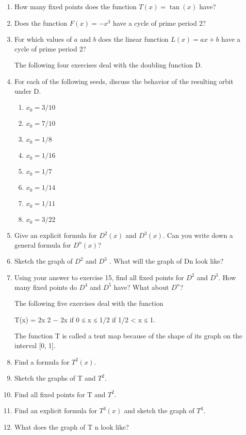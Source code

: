 \documentclass{beamer}
\begin{document}
\begin{frame}
\begin{enumerate}
\item How many ﬁxed points does the function $T(x) = \tan(x)$ have?
\item Does the function $F(x) = -x^3$ have a cycle of prime period 2?
\item For which values of $a$ and $b$ does the linear function $L(x) = ax + b$ have a cycle of prime period 2?

The following four exercises deal with the doubling function D.

\item For each of the following seeds, discuss the behavior of the resulting orbit
under D.

\begin{enumerate}
\item $x_0 = 3/10$
\item $x_0 = 7/10$
\item $x_0 = 1/8$
\item $x_0 = 1/16$
\item $x_0 = 1/7$
\item $x_0 = 1/14$
\item $x_0 = 1/11$
\item $x_0 = 3/22$
\end{enumerate}

\item Give an explicit formula for $D^2(x)$ and $D^3(x)$. Can you write down a
general formula for $D^n (x)$?

\item Sketch the graph of $D^2$ and $D^3$ . What will the graph of Dn look like?

\item Using your answer to exercise 15, ﬁnd all ﬁxed points for $D^2$ and $D^3$. How
many ﬁxed points do $D^4$ and $D^5$ have? What about $D^n$?


The following ﬁve exercises deal with the function

T(x) =
2x
2 − 2x
if 0 ≤ x ≤ 1/2
if 1/2 < x ≤ 1.

The function T is called a tent map because of the shape of its graph on the
interval [0, 1].

\item Find a formula for $T^2(x)$.
\item Sketch the graphs of T and $T^2$.
\item Find all ﬁxed points for T and $T^2$.
\item Find an explicit formula for $T^3(x)$ and sketch the graph of $T^3$.
\item What does the graph of T n look like?
\end{enumerate}










\end{frame}
\end{document}

